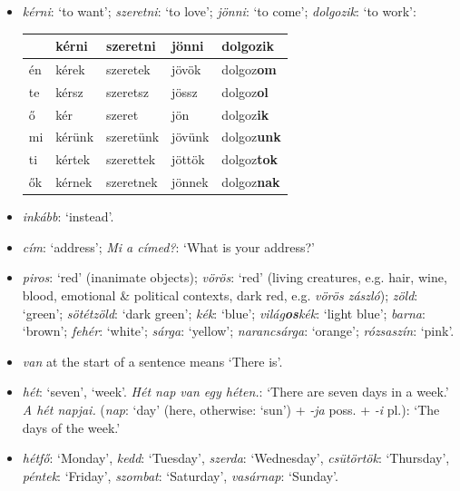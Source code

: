 \documentclass[a4paper,11pt]{article}
\begin{document}
\begin{itemize}
  \item \emph{kérni}: `to want'; \emph{szeretni}: `to love';
    \emph{jönni}: `to come'; \emph{dolgozik}: `to work':
    \begin{center}
      \begin{tabular}{l|llll}
        & \textbf{kérni} & \textbf{szeretni} & \textbf{jönni}
        & \textbf{dolgozik} \\
        \hline
        én & kérek  & szeretek  & jövök  & dolgoz\textbf{om}\\
        te & kérsz  & szeretsz  & jössz  & dolgoz\textbf{ol}\\
        ő  & kér    & szeret    & jön    & dolgoz\textbf{ik}\\
        mi & kérünk & szeretünk & jövünk & dolgoz\textbf{unk}\\
        ti & kértek & szerettek & jöttök & dolgoz\textbf{tok}\\
        ők & kérnek & szeretnek & jönnek & dolgoz\textbf{nak}
      \end{tabular}
    \end{center}

  \item \emph{inkább}: `instead'.

  \item \emph{cím}: `address'; \emph{Mi a címed?}: `What is your
    address?'

  \item \emph{piros}: `red' (inanimate objects); \emph{vörös}: `red'
    (living creatures, e.g. hair, wine, blood, emotional \& political
    contexts, dark red, e.g. \emph{vörös zászló}); \emph{zöld}:
    `green'; \emph{sötétzöld}: `dark green'; \emph{kék}: `blue';
    \emph{világ\textbf{os}kék}: `light blue'; \emph{barna}: `brown';
    \emph{fehér}: `white'; \emph{sárga}: `yellow'; \emph{narancsárga}:
    `orange'; \emph{rózsaszín}: `pink'.

  \item \emph{van} at the start of a sentence means `There is'.

  \item \emph{hét}: `seven', `week'. \emph{Hét nap van egy héten.}:
    `There are seven days in a week.' \emph{A hét napjai.}
    (\emph{nap}: `day' (here, otherwise: `sun') + \emph{-ja} poss. +
    \emph{-i} pl.): `The days of the week.'

  \item \emph{hétfő}: `Monday', \emph{kedd}: `Tuesday', \emph{szerda}:
    `Wednesday', \emph{csütörtök}: `Thursday', \emph{péntek}:
    `Friday', \emph{szombat}: `Saturday', \emph{vasárnap}: `Sunday'.


\end{itemize}
\end{document}
